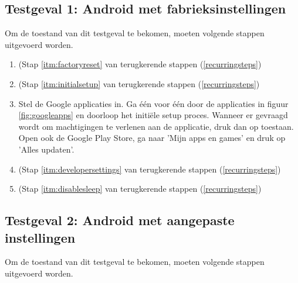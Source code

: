 \subsection{Testgeval 1: Android met fabrieksinstellingen}

Om de toestand van dit testgeval te bekomen, moeten volgende stappen uitgevoerd worden.
\begin{enumerate}
    \item 
     (Stap \ref{itm:factoryreset} van terugkerende stappen (\ref{recurringsteps})
    
    \item 
     (Stap \ref{itm:initialsetup} van terugkerende stappen (\ref{recurringsteps})
    
    \item 
    Stel de Google applicaties in. Ga één voor één door de applicaties in figuur \ref{fig:googleapps} en doorloop  het initiële setup proces. Wanneer er gevraagd wordt om machtigingen te verlenen aan de applicatie, druk dan op toestaan. Open ook de Google Play Store, ga naar 'Mijn apps en games' en druk op 'Alles updaten'.
    
    \item 
     (Stap \ref{itm:developersettings} van terugkerende stappen (\ref{recurringsteps})
    
    \item 
     (Stap \ref{itm:disablesleep} van terugkerende stappen (\ref{recurringsteps})
\end{enumerate}


\subsection{Testgeval 2: Android met aangepaste instellingen}

Om de toestand van dit testgeval te bekomen, moeten volgende stappen uitgevoerd worden.

